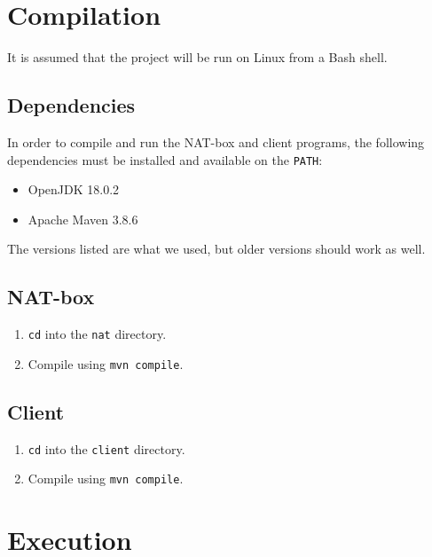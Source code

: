 \documentclass[10pt, a4paper]{article}
\begin{document}
\section{Compilation}
\label{sec:comp}

It is assumed that the project will be run on Linux from a Bash shell.


\subsection{Dependencies}
\label{ssec:deps}

In order to compile and run the NAT-box and client programs, the following
dependencies must be installed and available on the \texttt{PATH}:
\begin{itemize}
  \item OpenJDK 18.0.2
  \item Apache Maven 3.8.6
\end{itemize}
The versions listed are what we used, but older versions should work as well.


\subsection{NAT-box}
\label{ssec:compnat}

\begin{enumerate}
  \item \texttt{cd} into the \texttt{nat} directory.
  \item Compile using \texttt{mvn compile}.
\end{enumerate}


\subsection{Client}
\label{ssec:compcli}

\begin{enumerate}
  \item \texttt{cd} into the \texttt{client} directory.
  \item Compile using \texttt{mvn compile}.
\end{enumerate}



\section{Execution}
\label{sec:exec}
\end{document}
